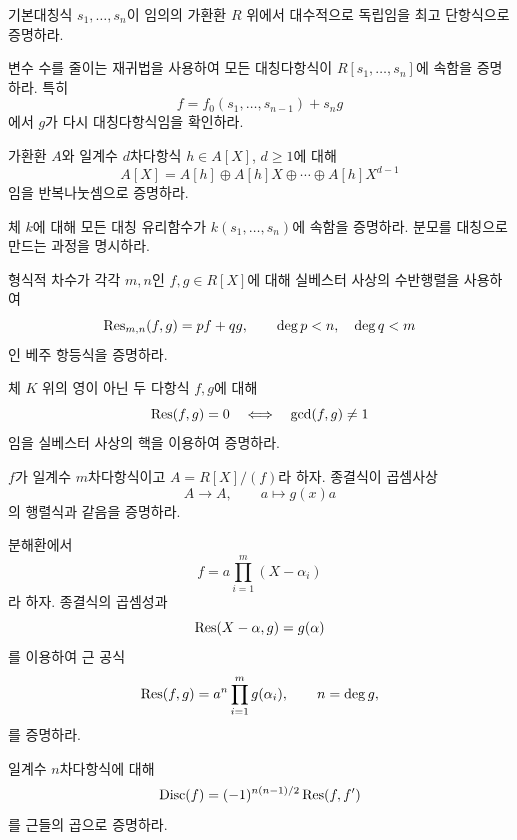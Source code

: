 \begin{exercise}
기본대칭식 $s_1,\dots,s_n$이 임의의 가환환 $R$ 위에서 대수적으로 독립임을 최고 단항식으로 증명하라.
\end{exercise}

\begin{exercise}
변수 수를 줄이는 재귀법을 사용하여 모든 대칭다항식이 $R[s_1,\dots,s_n]$에 속함을 증명하라. 특히
\[
  f=f_0(s_1,\dots,s_{n-1})+s_ng
\]
에서 $g$가 다시 대칭다항식임을 확인하라.
\end{exercise}

\begin{exercise}[*]
가환환 $A$와 일계수 $d$차다항식 $h\in A[X]$, $d\ge1$에 대해
\[
  A[X]=A[h]\oplus A[h]X\oplus\cdots\oplus A[h]X^{d-1}
\]
임을 반복나눗셈으로 증명하라.
\end{exercise}

\begin{exercise}
체 $k$에 대해 모든 대칭 유리함수가 $k(s_1,\dots,s_n)$에 속함을 증명하라. 분모를 대칭으로 만드는 과정을 명시하라.
\end{exercise}

\begin{exercise}[*]
형식적 차수가 각각 $m,n$인 $f,g\in R[X]$에 대해 실베스터 사상의 수반행렬을 사용하여
\[
  \operatorname{Res}_{m,n}(f,g)=pf+qg,
  \qquad
  \deg p<n,\quad\deg q<m
\]
인 베주 항등식을 증명하라.
\end{exercise}

\begin{exercise}
체 $K$ 위의 영이 아닌 두 다항식 $f,g$에 대해
\[
  \operatorname{Res}(f,g)=0
  \quad\Longleftrightarrow\quad
  \gcd(f,g)\ne1
\]
임을 실베스터 사상의 핵을 이용하여 증명하라.
\end{exercise}

\begin{exercise}[*]
$f$가 일계수 $m$차다항식이고 $A=R[X]/(f)$라 하자. 종결식이 곱셈사상
\[
  A\to A,
  \qquad a\mapsto g(x)a
\]
의 행렬식과 같음을 증명하라.
\end{exercise}

\begin{exercise}[*]
분해환에서
\[
  f=a\prod_{i=1}^m(X-\alpha_i)
\]
라 하자. 종결식의 곱셈성과
\[
  \operatorname{Res}(X-\alpha,g)=g(\alpha)
\]
를 이용하여 근 공식
\[
  \operatorname{Res}(f,g)=a^n\prod_{i=1}^m g(\alpha_i),
  \qquad n=\deg g,
\]
를 증명하라.
\end{exercise}

\begin{exercise}[*]
일계수 $n$차다항식에 대해
\[
  \operatorname{Disc}(f)=(-1)^{n(n-1)/2}\operatorname{Res}(f,f')
\]
를 근들의 곱으로 증명하라.
\end{exercise}

